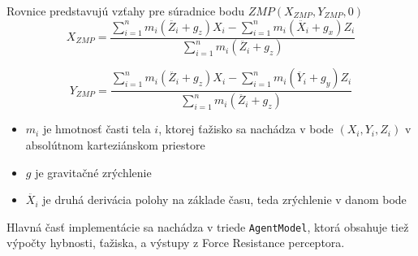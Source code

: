 Rovnice predstavujú vzťahy pre súradnice bodu $ZMP(X_{ZMP}, Y_{ZMP}, 0)$
\begin{equation}
	X_{ZMP} = \frac{\sum_{i=1}^{n}{m_i(\ddot{Z_i} + g_z)X_i - \sum_{i=1}^{n}{m_i(\ddot{X_i} + g_x)Z_i}}}
	{\sum_{i=1}^{n}{m_i(\ddot{Z_i} + g_z)}}
\end{equation}

\begin{equation}
	Y_{ZMP} = \frac{\sum_{i=1}^{n}{m_i(\ddot{Z_i} + g_z)X_i - \sum_{i=1}^{n}{m_i(\ddot{Y_i} + g_y)Z_i}}}
	{\sum_{i=1}^{n}{m_i(\ddot{Z_i} + g_z)}}
\end{equation}

\begin{itemize}
	\item $m_i$ je hmotnosť časti tela $i$, ktorej ťažisko sa nachádza v bode $(X_i, Y_i, Z_i)$ v absolútnom karteziánskom priestore
	\item $g$ je gravitačné zrýchlenie
	\item $\ddot{X_i}$ je druhá derivácia polohy na základe času, teda zrýchlenie v danom bode
\end{itemize}

Hlavná časť implementácie sa nachádza v triede \texttt{AgentModel}, ktorá obsahuje tiež výpočty hybnosti, ťažiska, a výstupy z Force Resistance perceptora.%


